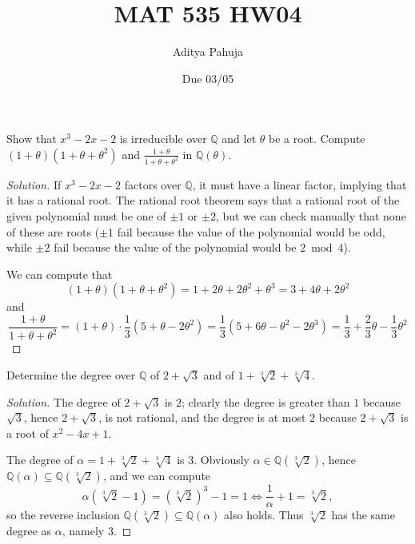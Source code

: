 \documentclass[10pt]{article}
\title{MAT 535 HW04}
\author{\large Aditya Pahuja}
\date{\large Due 03/05}
\providecommand{\QQ}{\mathbb Q}
\newenvironment{soln}{\begin{proof}[Solution]}{\end{proof}}
\begin{document}
\maketitle

\begin{problem}
    [\S13.1\#2]
    Show that $x^3 - 2x - 2$ is irreducible over $\QQ$
    and let $\theta$ be a root.
    Compute $(1+\theta)(1+\theta+\theta^2)$
    and $\frac{1+\theta}{1+\theta+\theta^2}$ in $\QQ(\theta)$.
\end{problem}

\begin{soln}
    If $x^3 - 2x - 2$ factors over $\QQ$, it must have
    a linear factor, implying that it has a rational root.
    The rational root theorem says that a rational root
    of the given polynomial must be one of $\pm 1$ or $\pm 2$,
    but we can check manually that none of these are roots
    ($\pm 1$ fail because the value of the polynomial
    would be odd, while $\pm 2$ fail because
    the value of the polynomial would be $2\bmod 4$).

    We can compute that
    \begin{equation*}
	(1 + \theta)(1 + \theta  +\theta^2)
	= 1 + 2\theta + 2\theta^2 + \theta^3
	= \boxed{3 + 4\theta + 2\theta^2}
    \end{equation*}
    and
    \begin{equation*}
	\frac{1+\theta}{1+\theta+\theta^2}
	= (1+\theta)\cdot \frac13(5 + \theta - 2\theta^2)
	= \frac13(5 + 6\theta - \theta^2 - 2\theta^3)
	= \boxed{\frac13 + \frac23\theta - \frac13\theta^2}
    \end{equation*}
\end{soln}

\begin{problem}
    [\S13.2\#4]
    Determine the degree over $\QQ$ of
    $2+\sqrt 3$ and of $1 + \sqrt[3]2 + \sqrt[3]4$.
\end{problem}

\begin{soln}
    The degree of $2+\sqrt3$ is $\boxed 2$;
    clearly the degree is greater than $1$ because $\sqrt3$,
    hence $2+\sqrt3$, is not rational,
    and the degree is at most $2$ because
    $2 + \sqrt3$ is a root of $x^2 - 4x + 1$.

    The degree of $\alpha = 1+\sqrt[3]2 + \sqrt[3]4$ is $\boxed 3$.
    Obviously $\alpha\in\QQ(\sqrt[3]2)$, hence
    $\QQ(\alpha)\subseteq\QQ(\sqrt[3]2)$,
    and we can compute
    \begin{equation*}
	\alpha(\sqrt[3]2 - 1) = (\sqrt[3]2)^3 - 1 = 1
	\iff \frac 1\alpha + 1 = \sqrt[3]2,
    \end{equation*}
    so the reverse inclusion $\QQ(\sqrt[3]2)\subseteq\QQ(\alpha)$ also holds.
    Thus $\sqrt[3]2$ has the same degree as $\alpha$, namely $3$.
\end{soln}
\end{document}
